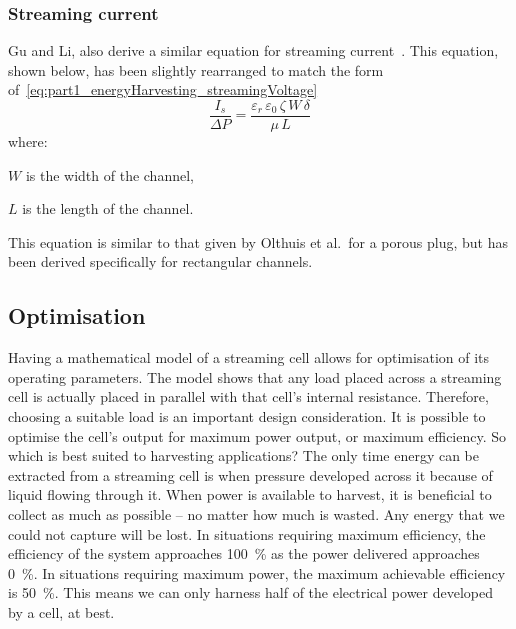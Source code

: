     \subsubsection*{Streaming current}


      Gu and Li, also derive a similar equation for streaming current~\cite{Gu2000}.
      This equation, shown below, has been slightly rearranged to match the form of~\cref{eq:part1_energyHarvesting_streamingVoltage}
      \begin{equation}
          \frac{I_{s}}{\Delta P} = \frac{\varepsilon_{r}\,\varepsilon_{0}\,\zeta\,W\,\delta}{\mu\,L}
          \label{eq:part1_energyHarvesting_streamingCurrent}
      \end{equation}
      where:
      \begin{description}
          \item $W$ is the width of the channel,
          \item $L$ is the length of the channel.
      \end{description}
      This equation is similar to that given by Olthuis et al.\ for a porous plug, but has been derived specifically for rectangular channels\cite{Olthuis2005}.


  \subsection{Optimisation}

    Having a mathematical model of a streaming cell allows for optimisation of its operating parameters.
    The model shows that any load placed across a streaming cell is actually placed in parallel with that cell's internal resistance.
    Therefore, choosing a suitable load is an important design consideration.
    It is possible to optimise the cell's output for maximum power output, or maximum efficiency.
    So which is best suited to harvesting applications?
    The only time energy can be extracted from a streaming cell is when pressure developed across it because of liquid flowing through it.
    When power is available to harvest, it is beneficial to collect as much as possible -- no matter how much is wasted.
    Any energy that we could not capture will be lost.
    In situations requiring maximum efficiency, the efficiency of the system approaches \SI{100}{\percent} as the power delivered approaches \SI{0}{\percent}.
    In situations requiring maximum power, the maximum achievable efficiency is \SI{50}{\percent}.
    This means we can only harness half of the electrical power developed by a cell, at best.


